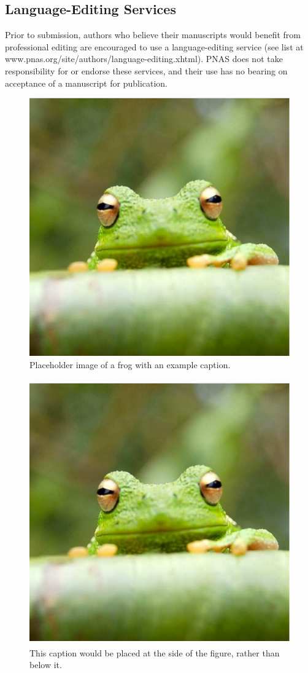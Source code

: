 \documentclass[9pt,twoside]{pnas-new}
\begin{document}
\subsection*{Language-Editing Services}
Prior to submission, authors who believe their manuscripts would benefit from professional editing are encouraged to use a language-editing service (see list at www.pnas.org/site/authors/language-editing.xhtml). PNAS does not take responsibility for or endorse these services, and their use has no bearing on acceptance of a manuscript for publication. 

\begin{figure}%
\centering
\includegraphics[width=.5\linewidth]{frog}
\caption{Placeholder image of a frog with an example caption.}
\label{fig:frog}
\end{figure}


\begin{figure}
\centering
\includegraphics[width=11.4cm,height=11.4cm]{frog}
\caption{This caption would be placed at the side of the figure, rather than below it.}\label{fig:side}
\end{figure}
\end{document}
